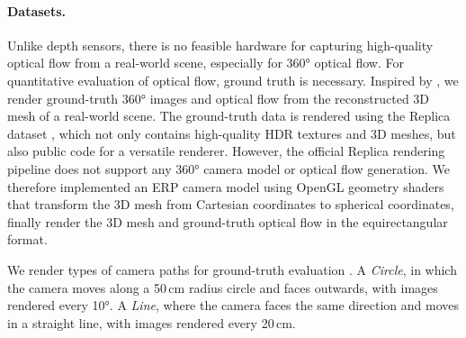 \paragraph{Datasets.}
%
%
%
Unlike depth sensors, %
there is no feasible hardware for capturing high-quality optical flow from a real-world scene, especially for 360° optical flow.
%
For quantitative evaluation of optical flow, ground truth is necessary.
%
Inspired by \citet{ShugrLKLSSF2019}, we render ground-truth 360° images and optical flow from the reconstructed 3D mesh of a real-world scene.
The ground-truth data is rendered using the Replica dataset \cite{StrauWMCWGEMRVCYBYPYZLCBGMPSBSNGLN2019}, which not only contains high-quality HDR textures and 3D meshes, but also public code for a versatile renderer.
%
However, the official Replica rendering pipeline does not support any 360° camera model or optical flow generation.
We therefore implemented an ERP camera model using OpenGL geometry shaders that transform the 3D mesh from Cartesian coordinates to spherical coordinates, finally render the 3D mesh and ground-truth optical flow in the equirectangular format.


We render  types of camera paths for ground-truth evaluation .
A \emph{Circle}, in which the camera moves along a 50\,cm radius circle and faces outwards, with images rendered every 10°.
A \emph{Line}, where the camera faces the same direction and moves in a straight line, with images rendered every 20\,cm.


